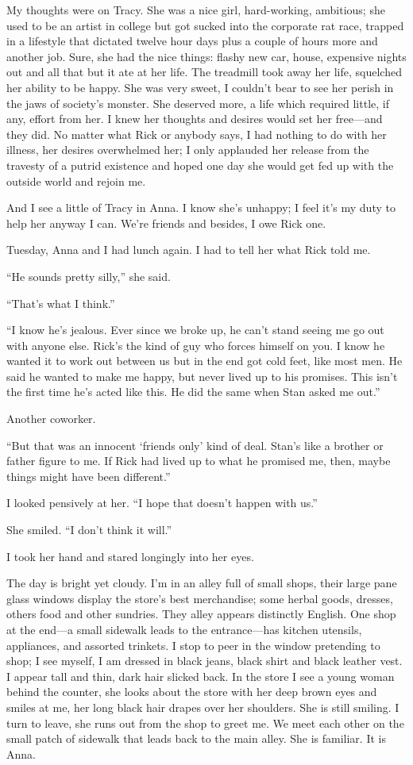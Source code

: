 \documentclass[
]{article}
\begin{document}
My thoughts were on Tracy. She was a nice girl, hard-working, ambitious;
she used to be an artist in college but got sucked into the corporate
rat race, trapped in a lifestyle that dictated twelve hour days plus a
couple of hours more and another job. Sure, she had the nice things:
flashy new car, house, expensive nights out and all that but it ate at
her life. The treadmill took away her life, squelched her ability to be
happy. She was very sweet, I couldn't bear to see her perish in the jaws
of society's monster. She deserved more, a life which required little,
if any, effort from her. I knew her thoughts and desires would set her
free---and they did. No matter what Rick or anybody says, I had nothing
to do with her illness, her desires overwhelmed her; I only applauded
her release from the travesty of a putrid existence and hoped one day
she would get fed up with the outside world and rejoin me.

And I see a little of Tracy in Anna. I know she's unhappy; I feel it's
my duty to help her anyway I can. We're friends and besides, I owe Rick
one.

Tuesday, Anna and I had lunch again. I had to tell her what Rick told
me.

``He sounds pretty silly,'' she said.

``That's what I think.''

``I know he's jealous. Ever since we broke up, he can't stand seeing me
go out with anyone else. Rick's the kind of guy who forces himself on
you. I know he wanted it to work out between us but in the end got cold
feet, like most men. He said he wanted to make me happy, but never lived
up to his promises. This isn't the first time he's acted like this. He
did the same when Stan asked me out.''

Another coworker.

``But that was an innocent `friends only' kind of deal. Stan's like a
brother or father figure to me. If Rick had lived up to what he promised
me, then, maybe things might have been different.''

I looked pensively at her. ``I hope that doesn't happen with us.''

She smiled. ``I don't think it will.''

I took her hand and stared longingly into her eyes.

The day is bright yet cloudy. I'm in an alley full of small shops, their
large pane glass windows display the store's best merchandise; some
herbal goods, dresses, others food and other sundries. They alley
appears distinctly English. One shop at the end---a small sidewalk leads
to the entrance---has kitchen utensils, appliances, and assorted
trinkets. I stop to peer in the window pretending to shop; I see myself,
I am dressed in black jeans, black shirt and black leather vest. I
appear tall and thin, dark hair slicked back. In the store I see a young
woman behind the counter, she looks about the store with her deep brown
eyes and smiles at me, her long black hair drapes over her shoulders.
She is still smiling. I turn to leave, she runs out from the shop to
greet me. We meet each other on the small patch of sidewalk that leads
back to the main alley. She is familiar. It is Anna.
\end{document}
